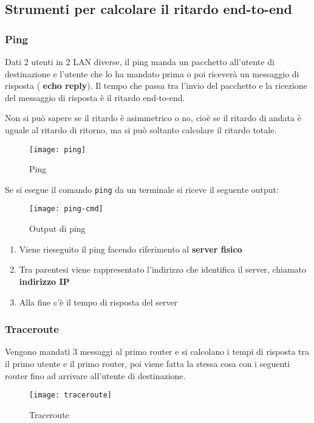 \documentclass[a4paper]{article}
\begin{document}
\subsection{Strumenti per calcolare il ritardo end-to-end}
\subsubsection{Ping}
Dati 2 utenti in 2 LAN diverse, il ping manda un pacchetto all'utente di destinazione
e l'utente che lo ha mandato prima o poi riceverà un messaggio di risposta (\textbf{
echo reply}). Il tempo che passa tra l'invio del pacchetto e la ricezione del
messaggio di risposta è il ritardo end-to-end.

\vspace{1em}
\noindent
Non si può sapere se il ritardo è asimmetrico o no, cioè se il ritardo di andata è uguale
al ritardo di ritorno, ma si può soltanto calcolare il ritardo totale.
\begin{figure}[H]
  \centering
  \texttt{[image: ping]}
  \caption{Ping}
\end{figure}

\noindent
Se si esegue il comando \texttt{ping} da un terminale si riceve il seguente output:
\begin{figure}[H]
  \centering
  \texttt{[image: ping-cmd]}
  \caption{Output di ping}
\end{figure}

\begin{enumerate}
  \item Viene rieseguito il ping facendo riferimento al \textbf{server fisico}
  \item Tra parentesi viene rappresentato l'indirizzo che identifica il server, chiamato
    \textbf{indirizzo IP}
  \item Alla fine c'è il tempo di risposta del server
\end{enumerate}

\subsubsection{Traceroute}
Vengono mandati 3 messaggi al primo router e si calcolano i tempi di risposta tra
il primo utente e il primo router, poi viene fatta la stessa cosa con i seguenti
router fino ad arrivare all'utente di destinazione.
\begin{figure}[H]
  \centering
  \texttt{[image: traceroute]}
  \caption{Traceroute}
\end{figure}
\end{document}
